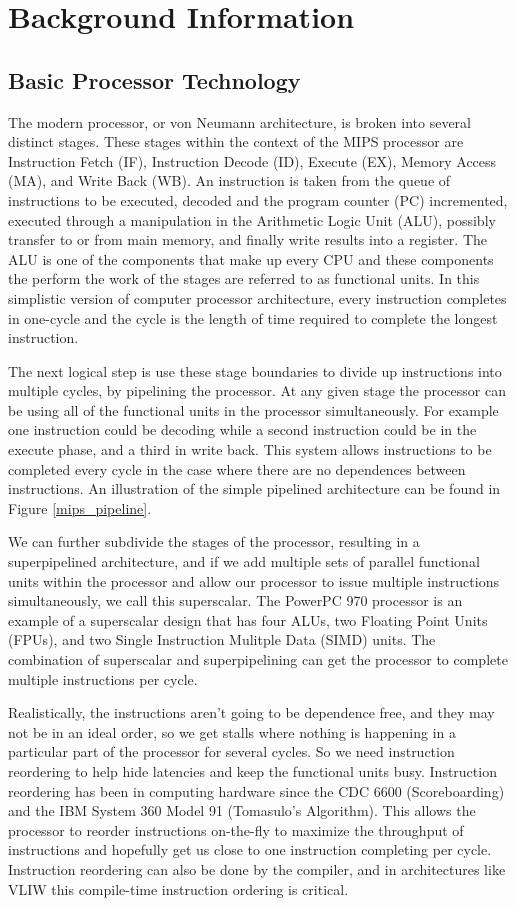 \documentclass[12pt,twoside,letterpaper]{article}
\begin{document}
\section*{Background Information}
\subsection*{Basic Processor Technology}
The modern processor, or von Neumann architecture, is broken into several distinct stages. These stages within the context of the MIPS processor are Instruction Fetch (IF), Instruction Decode (ID), Execute (EX), Memory Access (MA), and Write Back (WB). An instruction is taken from the queue of instructions to be executed, decoded and the program counter (PC) incremented, executed through a manipulation in the Arithmetic Logic Unit (ALU), possibly transfer to or from main memory, and finally write results into a register. The ALU is one of the components that make up every CPU and these components the perform the work of the stages are referred to as functional units. In this simplistic version of computer processor architecture, every instruction completes in one-cycle and the cycle is the length of time required to complete the longest instruction. 

The next logical step is use these stage boundaries to divide up instructions into multiple cycles, by pipelining the processor. At any given stage the processor can be using all of the functional units in the processor simultaneously. For example one instruction could be decoding while a second instruction could be in the execute phase, and a third in write back. This system allows instructions to be completed every cycle in the case where there are no dependences between instructions. An illustration of the simple pipelined architecture can be found in Figure \ref{mips_pipeline}.

We can further subdivide the stages of the processor, resulting in a superpipelined architecture, and if we add multiple sets of parallel functional units within the processor and allow our processor to issue multiple instructions simultaneously, we call this superscalar. The PowerPC 970 processor is an example of a superscalar design that has four ALUs, two Floating Point Units (FPUs), and two Single Instruction Mulitple Data (SIMD) units. The combination of superscalar and superpipelining can get the processor to complete multiple instructions per cycle.

Realistically, the instructions aren't going to be dependence free, and they may not be in an ideal order, so we get stalls where nothing is happening in a particular part of the processor for several cycles. So we need instruction reordering to help hide latencies and keep the functional units busy. Instruction reordering has been in computing hardware since the CDC 6600 (Scoreboarding) and the IBM System 360 Model 91 (Tomasulo's Algorithm). This allows the processor to reorder instructions on-the-fly to maximize the throughput of instructions and hopefully get us close to one instruction completing per cycle. Instruction reordering can also be done by the compiler, and in architectures like VLIW this compile-time instruction ordering is critical.
\end{document}
